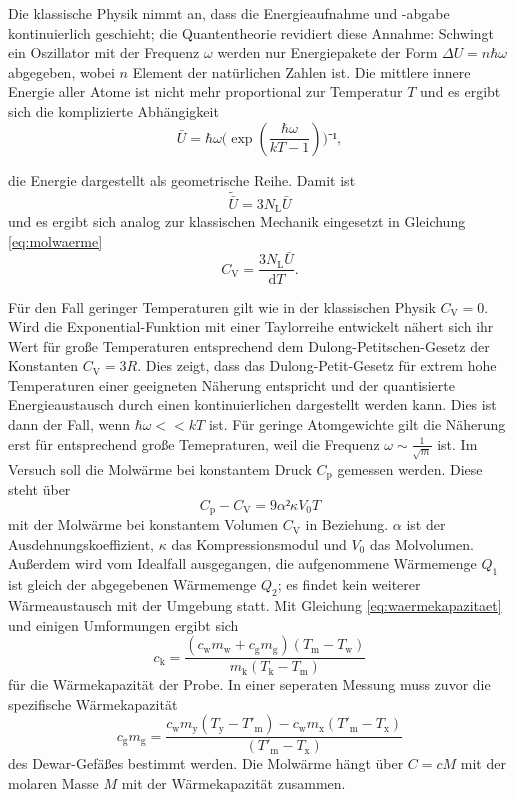 Die klassische Physik nimmt an, dass die Energieaufnahme und -abgabe kontinuierlich geschieht; die Quantentheorie revidiert diese Annahme: Schwingt ein Oszillator mit der Frequenz $\omega$ werden nur Energiepakete der Form $\Delta{U}=n \hbar \omega$ abgegeben, wobei $n$ Element der natürlichen Zahlen ist. 
Die mittlere innere Energie aller Atome ist nicht mehr proportional zur Temperatur $T$ und es ergibt sich die komplizierte Abhängigkeit
\begin{equation}
{\bar{U}=\hbar\omega(\exp(\frac{\hbar\omega}{kT-1})})⁻¹,
\end{equation}

die Energie dargestellt als geometrische Reihe.
Damit ist
\begin{equation}
\tilde{{\bar{U}}}=3N_\mathup{L}\bar{U}
\end{equation}
und es ergibt sich analog zur klassischen Mechanik eingesetzt in Gleichung \eqref{eq:molwaerme}  
\begin{equation}
C_\mathup{V}=\frac{3N_\mathup{L}\bar{U}}{\mathup{d}T}.
\end{equation}


Für den Fall geringer Temperaturen gilt wie in der klassischen Physik $C_\mathup{V}=0$. Wird die Exponential-Funktion mit einer Taylorreihe entwickelt nähert sich ihr Wert für große Temperaturen entsprechend dem Dulong-Petitschen-Gesetz der Konstanten $C_\mathup{V}=3R$.
Dies zeigt, dass das Dulong-Petit-Gesetz für extrem hohe Temperaturen einer geeigneten Näherung entspricht und der quantisierte Energieaustausch durch einen kontinuierlichen dargestellt werden kann. Dies ist dann der Fall, wenn $\hbar\omega<<kT$ ist. 
Für geringe Atomgewichte gilt die Näherung erst für entsprechend große Temepraturen, weil die Frequenz $\omega\sim \frac{1}{\sqrt{m}}$ ist.
Im Versuch soll die Molwärme bei konstantem Druck $C_\mathup{p}$ gemessen werden. Diese steht über
\begin{equation}
C_\mathup{p}-C_\mathup{V}=9{\alpha}²\kappa V_0 T
\end{equation}
mit der Molwärme bei konstantem Volumen $C_\mathup{V}$ in Beziehung. $\alpha$ ist der Ausdehnungskoeffizient, $\kappa$ das Kompressionsmodul und $V_0$ das Molvolumen.
Außerdem wird vom Idealfall ausgegangen, die aufgenommene Wärmemenge $Q_1$ ist gleich der abgegebenen Wärmemenge $Q_2$; es findet kein weiterer Wärmeaustausch mit der Umgebung statt.
Mit Gleichung \eqref{eq:waermekapazitaet} und einigen Umformungen ergibt sich
\begin{equation}
c_\mathup{k}=\frac{(c_\mathup{w}m_\mathup{w}+c_\mathup{g}m_\mathup{g})(T_\mathup{m}-T_\mathup{w})}{m_\mathup{k}(T_\mathup{k}-T_\mathup{m})}
\end{equation}
für die Wärmekapazität der Probe. 
In einer seperaten Messung muss zuvor die spezifische Wärmekapazität 
\begin{equation}
c_\mathup{g}m_\mathup{g}=\frac{c_\mathup{w}m_\mathup{y}(T_\mathup{y}-T'_\mathup{m})-c_\mathup{w}m_\mathup{x}(T'_\mathup{m}-T_\mathup{x})}{(T'_\mathup{m}-T_\mathup{x})}
\label{c_Dewar}
\end{equation}
des Dewar-Gefäßes bestimmt werden. 
Die Molwärme hängt über $C=cM$ mit der molaren Masse $M$ mit der Wärmekapazität zusammen.


